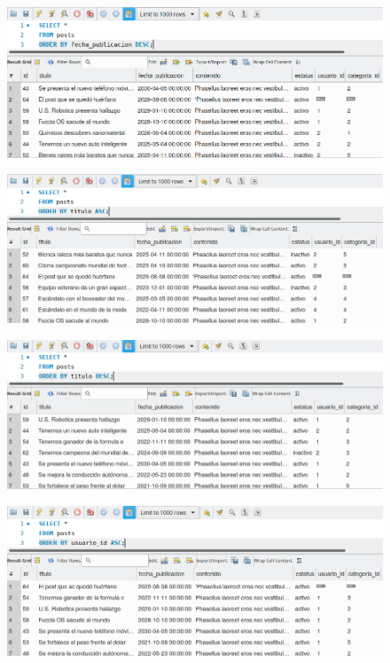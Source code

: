 \documentclass{article}
\begin{document}
\begin{figure}[h!]
  \centering
  \includegraphics[scale=0.75]{./Pictures/124_order_by_desc.png}
\end{figure}

\begin{figure}[h!]
  \centering
  \includegraphics[scale=0.75]{./Pictures/125_order_by_titulo.png}
\end{figure}

\begin{figure}[h!]
  \centering
  \includegraphics[scale=0.75]{./Pictures/126_order_by_titulo.png}
\end{figure}

\begin{figure}[h!]
  \centering
  \includegraphics[scale=0.75]{./Pictures/127_order_by_id_asc.png}
\end{figure}
\end{document}
